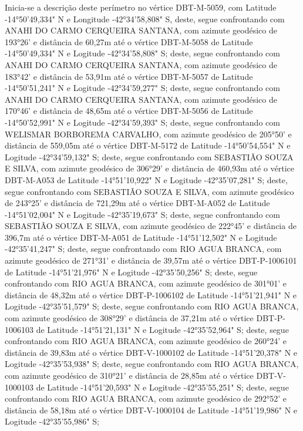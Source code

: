Inicia-se a descrição deste perímetro no vértice DBT-M-5059, 
com Latitude -14°50'49,334" N e Longitude -42°34'58,808" S, deste, segue confrontando com ANAHI DO CARMO CERQUEIRA SANTANA, com azimute geodésico de 193°26' e distância de 
60,27m até o vértice DBT-M-5058 de Latitude -14°50'49,334" N e Logitude -42°34'58,808" S;
deste, segue confrontando com ANAHI DO CARMO CERQUEIRA SANTANA, com azimute geodésico de 183°42' e distância de 
53,91m até o vértice DBT-M-5057 de Latitude -14°50'51,241" N e Logitude -42°34'59,277" S;
deste, segue confrontando com ANAHI DO CARMO CERQUEIRA SANTANA, com azimute geodésico de 170°46' e distância de 
48,65m até o vértice DBT-M-5056 de Latitude -14°50'52,991" N e Logitude -42°34'59,393" S;
deste, segue confrontando com WELISMAR BORBOREMA CARVALHO, com azimute geodésico de 205°50' e distância de 
559,05m até o vértice DBT-M-5172 de Latitude -14°50'54,554" N e Logitude -42°34'59,132" S;
deste, segue confrontando com SEBASTIÃO SOUZA E SILVA, com azimute geodésico de 306°29' e distância de 
460,93m até o vértice DBT-M-A053 de Latitude -14°51'10,922" N e Logitude -42°35'07,281" S;
deste, segue confrontando com SEBASTIÃO SOUZA E SILVA, com azimute geodésico de 243°25' e distância de 
721,29m até o vértice DBT-M-A052 de Latitude -14°51'02,004" N e Logitude -42°35'19,673" S;
deste, segue confrontando com SEBASTIÃO SOUZA E SILVA, com azimute geodésico de 222°45' e distância de 
396,7m até o vértice DBT-M-A051 de Latitude -14°51'12,502" N e Logitude -42°35'41,247" S;
deste, segue confrontando com RIO AGUA BRANCA, com azimute geodésico de 271°31' e distância de 
39,57m até o vértice DBT-P-1006101 de Latitude -14°51'21,976" N e Logitude -42°35'50,256" S;
deste, segue confrontando com RIO AGUA BRANCA, com azimute geodésico de 301°01' e distância de 
48,32m até o vértice DBT-P-1006102 de Latitude -14°51'21,941" N e Logitude -42°35'51,579" S;
deste, segue confrontando com RIO AGUA BRANCA, com azimute geodésico de 308°29' e distância de 
37,21m até o vértice DBT-P-1006103 de Latitude -14°51'21,131" N e Logitude -42°35'52,964" S;
deste, segue confrontando com RIO AGUA BRANCA, com azimute geodésico de 260°24' e distância de 
39,83m até o vértice DBT-V-1000102 de Latitude -14°51'20,378" N e Logitude -42°35'53,938" S;
deste, segue confrontando com RIO AGUA BRANCA, com azimute geodésico de 310°21' e distância de 
28,85m até o vértice DBT-V-1000103 de Latitude -14°51'20,593" N e Logitude -42°35'55,251" S;
deste, segue confrontando com RIO AGUA BRANCA, com azimute geodésico de 292°52' e distância de 
58,18m até o vértice DBT-V-1000104 de Latitude -14°51'19,986" N e Logitude -42°35'55,986" S;
